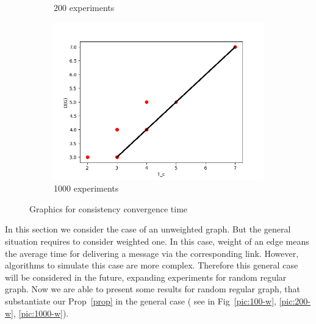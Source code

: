 \documentclass{llncs}
\begin{document}
\begin{figure}[p]
\begin{subfigure}{0.3\linewidth}
\caption{200 experiments}\label{200}
\end{subfigure}
\begin{subfigure}{0.3\linewidth}
\centering\includegraphics[width=\linewidth]{images/1000-consistency-convergence.png}
\caption{1000 experiments}\label{1000}
\end{subfigure}
\caption{Graphics for consistency convergence time}
\end{figure}
%
In this section we consider the case of an unweighted graph. 
But the general situation requires to consider weighted one.
In this case, weight of an edge means the average time for delivering a message via the corresponding link.
However, algorithms to simulate this case are more complex.
Therefore this general case will be considered in the future, expanding experiments for random regular graph. Now we are able to present some results for random regular graph, that substantiate our Prop~\ref{prop} in the general case (
see in Fig~\ref{pic:100-w}, \ref{pic:200-w}, \ref{pic:1000-w}).
\end{document}
